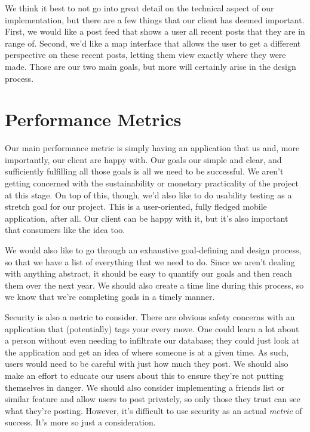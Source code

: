 \documentclass[draftclsnofoot,onecolumn,journal,letterpaper,10pt]{IEEEtran}
\begin{document}
We think it best to not go into great detail on the technical aspect of our implementation, but there are a few things that our client has deemed important. First, we would like a post feed that shows a user all recent posts that they are in range of. Second, we'd like a map interface that allows the user to get a different perspective on these recent posts, letting them view exactly where they were made. Those are our two main goals, but more will certainly arise in the design process.

\section{Performance Metrics}

Our main performance metric is simply having an application that us and, more importantly, our client are happy with. Our goals our simple and clear, and sufficiently fulfilling all those goals is all we need to be successful. We aren't getting concerned with the sustainability or monetary practicality of the project at this stage. On top of this, though, we'd also like to do usability testing as a stretch goal for our project. This is a user-oriented, fully fledged mobile application, after all. Our client can be happy with it, but it's also important that consumers like the idea too. 

We would also like to go through an exhaustive goal-defining and design process, so that we have a list of everything that we need to do. Since we aren't dealing with anything abstract, it should be easy to quantify our goals and then reach them over the next year. We should also create a time line during this process, so we know that we're completing goals in a timely manner. 

Security is also a metric to consider. There are obvious safety concerns with an application that (potentially) tags your every move. One could learn a lot about a person without even needing to infiltrate our database; they could just look at the application and get an idea of where someone is at a given time. As such, users would need to be careful with just how much they post. We should also make an effort to educate our users about this to ensure they're not putting themselves in danger. We should also consider implementing a friends list or similar feature and allow users to post privately, so only those they trust can see what they're posting. However, it's difficult to use security as an actual \textit{metric} of success. It's more so just a consideration. 
\end{document}
